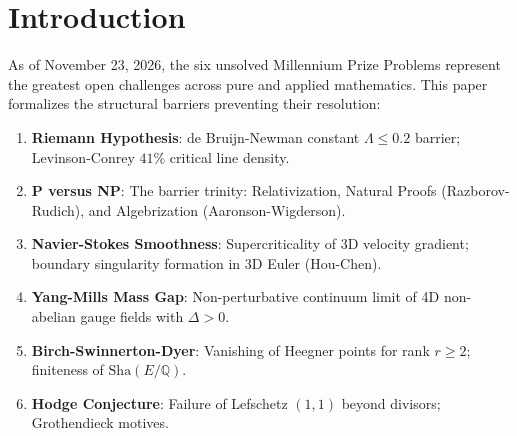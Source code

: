 \documentclass[10pt,twocolumn,letterpaper]{article}
\begin{document}
\section{Introduction}
As of November 23, 2026, the six unsolved Millennium Prize Problems represent the greatest open challenges across pure and applied mathematics. This paper formalizes the structural barriers preventing their resolution:
\begin{enumerate}
    \item \textbf{Riemann Hypothesis}: de Bruijn-Newman constant $\Lambda \le 0.2$ barrier; Levinson-Conrey $41\%$ critical line density.
    \item \textbf{P versus NP}: The barrier trinity: Relativization, Natural Proofs (Razborov-Rudich), and Algebrization (Aaronson-Wigderson).
    \item \textbf{Navier-Stokes Smoothness}: Supercriticality of 3D velocity gradient; boundary singularity formation in 3D Euler (Hou-Chen).
    \item \textbf{Yang-Mills Mass Gap}: Non-perturbative continuum limit of 4D non-abelian gauge fields with $\Delta > 0$.
    \item \textbf{Birch-Swinnerton-Dyer}: Vanishing of Heegner points for rank $r \ge 2$; finiteness of $\mathrm{Sha}(E/\mathbb{Q})$.
    \item \textbf{Hodge Conjecture}: Failure of Lefschetz $(1,1)$ beyond divisors; Grothendieck motives.
\end{enumerate}
\end{document}
